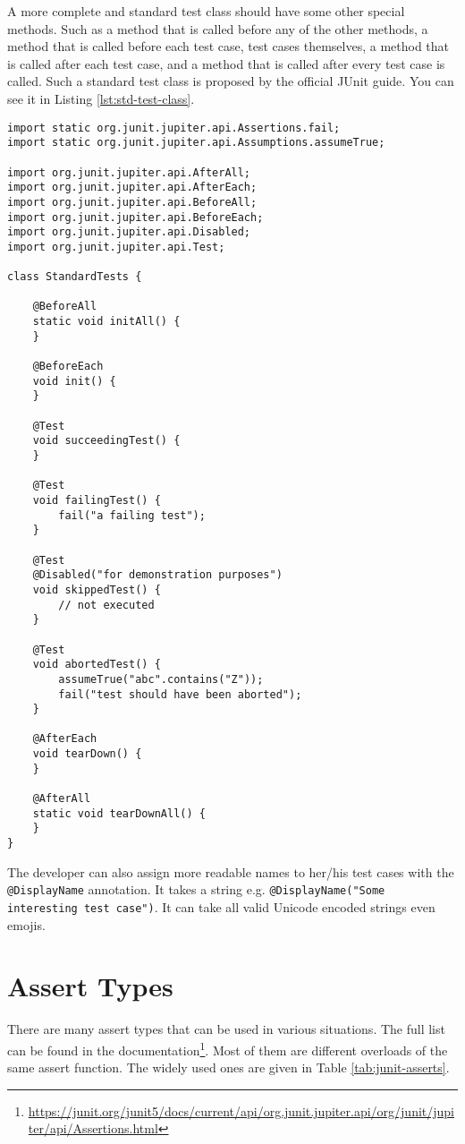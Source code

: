 A more complete and standard test class should have some other special methods. Such as a method that is called before any of the other methods, a method that is called before each test case, test cases themselves, a method that is called after each test case, and a method that is called after every test case is called. Such a standard test class is proposed by the official JUnit guide. You can see it in Listing \ref{lst:std-test-class}.

\begin{lstlisting}[caption={A standard test class.},label=lst:std-test-class]
import static org.junit.jupiter.api.Assertions.fail;
import static org.junit.jupiter.api.Assumptions.assumeTrue;

import org.junit.jupiter.api.AfterAll;
import org.junit.jupiter.api.AfterEach;
import org.junit.jupiter.api.BeforeAll;
import org.junit.jupiter.api.BeforeEach;
import org.junit.jupiter.api.Disabled;
import org.junit.jupiter.api.Test;

class StandardTests {

    @BeforeAll
    static void initAll() {
    }
    
    @BeforeEach
    void init() {
    }
    
    @Test
    void succeedingTest() {
    }
    
    @Test
    void failingTest() {
        fail("a failing test");
    }
    
    @Test
    @Disabled("for demonstration purposes")
    void skippedTest() {
        // not executed
    }
    
    @Test
    void abortedTest() {
        assumeTrue("abc".contains("Z"));
        fail("test should have been aborted");
    }
    
    @AfterEach
    void tearDown() {
    }
    
    @AfterAll
    static void tearDownAll() {
    }
}
\end{lstlisting}

The developer can also assign more readable names to her/his test cases with the \lstinline!@DisplayName! annotation. It takes a string e.g. \lstinline!@DisplayName("Some interesting test case")!. It can take all valid Unicode encoded strings even emojis.

\section{Assert Types}
There are many assert types that can be used in various situations. The full list can be found in the documentation\footnote{\url{https://junit.org/junit5/docs/current/api/org.junit.jupiter.api/org/junit/jupiter/api/Assertions.html}}. Most of them are different overloads of the same assert function. The widely used ones are given in Table \ref{tab:junit-asserts}.

